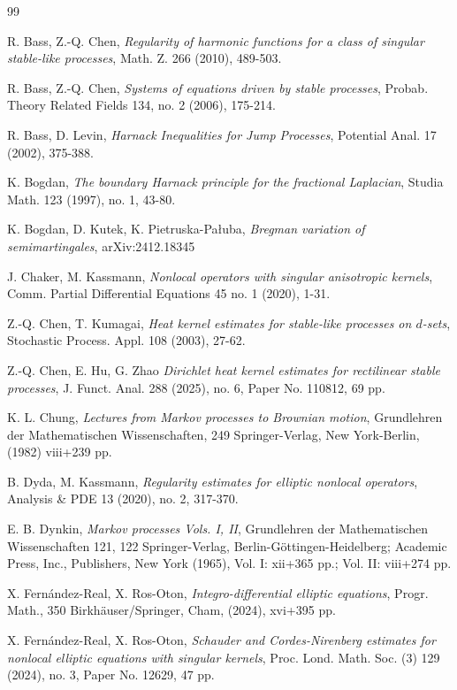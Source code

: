 \documentclass[a4paper,12pt,reqno]{amsart}
\theoremstyle{definition}
\theoremstyle{remark}
\begin{document}
\begin{thebibliography}{99}


 R. Bass, Z.-Q. Chen, \emph{Regularity of harmonic functions for a class of singular
stable-like processes}, Math. Z. 266 (2010), 489-503.

 R. Bass, Z.-Q. Chen, \emph{Systems of equations driven by stable processes}, 
Probab. Theory Related Fields 134, no. 2 (2006), 175-214.

 R. Bass, D. Levin, \emph{Harnack Inequalities for Jump Processes}, Potential Anal. 17 (2002), 375-388.


 K. Bogdan, \emph{The boundary Harnack principle for the fractional Laplacian}, 
Studia Math. 123 (1997), no. 1, 43-80.

 K. Bogdan, D. Kutek, K. Pietruska-Pa{\l}uba, \emph{Bregman variation of semimartingales}, arXiv:2412.18345

 J. Chaker, M. Kassmann, \emph{Nonlocal operators with singular anisotropic kernels},  Comm. Partial Differential Equations 45 no. 1 (2020), 1-31.

 Z.-Q. Chen, T. Kumagai, \emph{Heat kernel estimates for stable-like processes on $d$-sets}, Stochastic
Process. Appl. 108 (2003), 27-62.

 Z.-Q. Chen, E. Hu, G. Zhao \emph{Dirichlet heat kernel estimates for rectilinear stable processes},
J. Funct. Anal. 288 (2025), no. 6, Paper No. 110812, 69 pp.

 K. L. Chung, \emph{Lectures from Markov processes to Brownian motion}, 
Grundlehren der Mathematischen Wissenschaften, 249 Springer-Verlag, New York-Berlin, (1982) viii+239 pp.

 B. Dyda, M. Kassmann, \emph{Regularity estimates for elliptic nonlocal operators}, Analysis \& PDE 13 (2020), no. 2, 317-370.

 E. B. Dynkin, \emph{Markov processes {V}ols. {I}, {II}}, Grundlehren der Mathematischen Wissenschaften 121, 122 Springer-Verlag, Berlin-G\"ottingen-Heidelberg; Academic Press, Inc., Publishers, New York (1965), Vol. I: xii+365 pp.; Vol. II: viii+274 pp. 

 X. Fern{\'a}ndez-Real, X. Ros-Oton, \emph{Integro-differential elliptic equations}, Progr. Math., 350
Birkhäuser/Springer, Cham, (2024), xvi+395 pp.

 X. Fern{\'a}ndez-Real, X. Ros-Oton, \emph{Schauder and Cordes-Nirenberg estimates for nonlocal elliptic equations with singular kernels}, Proc. Lond. Math. Soc. (3) 129 (2024), no. 3, Paper No. 12629, 47 pp.


\end{thebibliography}
\end{document}
